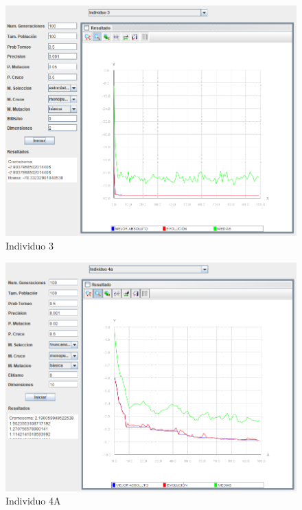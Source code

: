 \documentclass[twoside]{AiTeX}
\begin{document}
\begin{figure}[H]
    \centering
    \includegraphics[width = \textwidth]{Images/Individuo3.png}
    \caption{Individuo 3}
    \label{fig:3}
\end{figure}

\begin{figure}[H]
    \centering
    \includegraphics[width = \textwidth]{Images/Individuo4a.png}
    \caption{Individuo 4A}
    \label{fig:4a}
\end{figure}
\end{document}
